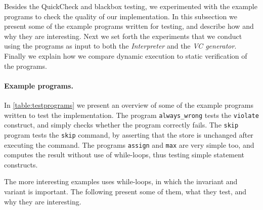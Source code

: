 Besides the QuickCheck and blackbox testing, we experimented with the example programs to check the quality of our implementation.
In this subsection we present some of the example programs written for testing, and describe how and why they are interesting.
Next we set forth the experiments that we conduct using the programs as input to both the \textit{Interpreter} and the \textit{VC generator}.
Finally we explain how we compare dynamic execution to static verification of the programs.

\paragraph{Example programs.}
In \cref{table:testprograms} we present an overview of some of the example programs written to test the implementation.
The program \texttt{always\_wrong} tests the \texttt{violate} construct, and simply checks whether the program correctly fails.
The \texttt{skip} program tests the \texttt{skip} command, by asserting that the store is unchanged after executing the command.
The programs \texttt{assign} and \texttt{max} are very simple too, and computes the result without use of while-loops, thus testing simple statement constructs.

The more interesting examples uses while-loops, in which the invariant and variant is important. The following present some of them, what they test, and why they are interesting.

